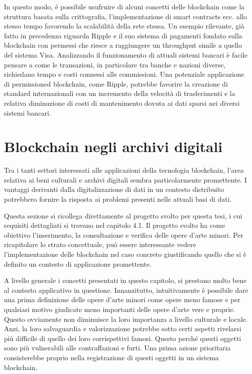In questo modo, è possibile usufruire di alcuni concetti delle blockchain come la struttura basata sulla crittografia, l’implementazione di smart contracts ecc. allo stesso tempo favorendo la scalabilità della rete stessa. Un esempio rilevante, già fatto in precedenza riguarda Ripple e il suo sistema di pagamenti fondato sulla blockchain con permessi che riesce a raggiungere un throughput simile a quello del sistema Visa. Analizzando il funzionamento di attuali sistemi bancari è facile pensare a come le transazioni, in particolare tra banche e nazioni diverse, richiedano tempo e costi connessi alle commissioni. Una potenziale applicazione di permissioned blockchain, come Ripple, potrebbe favorire la creazione di standard internazionali con un incremento della velocità di trasferimenti e la relativa diminuzione di costi di mantenimento dovuta ai dati sparsi nei diversi sistemi bancari.

\section{Blockchain negli archivi digitali} %

Tra i tanti settori interessati alle applicazioni della tecnologia blockchain, l’area relativa ai beni culturali e archivi digitali sembra particolarmente promettente. I vantaggi derivanti dalla digitalizzazione di dati in un contesto distribuito potrebbero fornire la risposta ai problemi presenti nelle attuali basi di dati. 

Questa sezione si ricollega direttamente al progetto svolto per questa tesi, i cui requisiti dettagliati si trovano nel capitolo 4.1. Il progetto svolto ha come obiettivo l’inserimento, la consultazione e verifica delle opere d’arte minori. Per ricapitolare lo strato concettuale, può essere interessante vedere l’implementazione delle blockchain nel caso concreto giustificando quello che si è definito un contesto di applicazione promettente. 

A livello generale i concetti presentati in questo capitolo, si prestano molto bene al contesto applicativo in questione. Innanzitutto, intuitivamente è possibile dare una prima definizione delle opere d’arte minori come opere meno famose e per qualsiasi motivo giudicate meno importanti delle opere d’arte vere e proprie. Questo ovviamente non diminuisce la loro importanza a livello culturale e locale. Anzi, la loro salvaguardia e valorizzazione potrebbe sotto certi aspetti rivelarsi più difficile di quello dei loro corrispettivi famosi. Questo perché questi oggetti sono più vulnerabili alle contraffazioni e furti. Una prima azione prioritaria consisterebbe proprio nella registrazione di questi oggetti in un sistema blockchain. 

